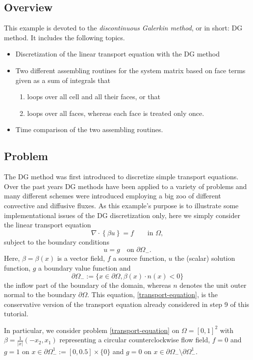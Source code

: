 \documentclass[11pt]{article}
\begin{document}
\subsection{Overview}
This example is devoted to the \emph{discontinuous Galerkin method}, or
in short: DG method. It includes the following topics.
\begin{itemize}
\item Discretization of the linear transport equation with the DG method
\item Two different assembling routines for the system matrix based on
  face terms given as a sum of integrals that
\begin{enumerate}
\item loops over all cell and all their faces, or that
\item loops over all faces, whereas each face is treated only once.
\end{enumerate}
\item Time comparison of the two assembling routines.
\end{itemize}

\subsection{Problem}
The DG method was first introduced to discretize simple transport
equations. Over the past years DG methods have been applied to a
variety of problems and many different schemes were introduced
employing a big zoo of different convective and diffusive fluxes.  As
this example's purpose is to illustrate some implementational issues
of the DG discretization only, here we simply consider the linear
transport equation
\begin{equation}\label{transport-equation}
  \nabla\cdot \left\{\beta u\right\}=f  \qquad\mbox{in }\Omega,
\end{equation}
subject to the boundary conditions
\[
u=g\quad\mbox{on }\partial\Omega_-.
\]
Here, $\beta=\beta(x)$ is a vector field, $f$ a source function, $u$ the
(scalar) solution function, $g$ a boundary value function and
\[
\partial\Omega_-:=\{x\in\partial\Omega, \beta(x)\cdot n(x)<0\}
\]
the inflow part of the boundary of the domain, whereas $n$ denotes the
unit outer normal to the boundary $\partial\Omega$. This
equation, \eqref{transport-equation}, is the conservative version of
the transport equation already considered in step 9 of this tutorial.

In particular, we consider problem \eqref{transport-equation} on
$\Omega=[0,1]^2$ with $\beta=\frac{1}{|x|}(-x_2, x_1)$ representing a
circular counterclockwise flow field, $f=0$ and $g=1$ on
$x\in\partial\Omega_-^1:=[0,0.5]\times\{0\}$ and $g=0$ on $x\in
\partial\Omega_-\setminus \partial\Omega_-^1$.
\end{document}
